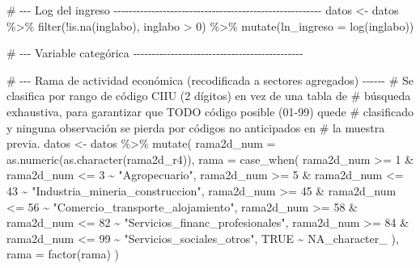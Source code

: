 \documentclass[
  spanish,
  letterpaper,
  DIV=11,
  numbers=noendperiod]{scrartcl}
\newenvironment{Shaded}{\begin{snugshade}}{\end{snugshade}}
\newcommand{\AlertTok}[1]{\textcolor[rgb]{0.68,0.00,0.00}{#1}}
\newcommand{\AttributeTok}[1]{\textcolor[rgb]{0.40,0.45,0.13}{#1}}
\newcommand{\CommentTok}[1]{\textcolor[rgb]{0.37,0.37,0.37}{#1}}
\newcommand{\ConstantTok}[1]{\textcolor[rgb]{0.56,0.35,0.01}{#1}}
\newcommand{\DecValTok}[1]{\textcolor[rgb]{0.68,0.00,0.00}{#1}}
\newcommand{\FunctionTok}[1]{\textcolor[rgb]{0.28,0.35,0.67}{#1}}
\newcommand{\NormalTok}[1]{\textcolor[rgb]{0.00,0.23,0.31}{#1}}
\newcommand{\OtherTok}[1]{\textcolor[rgb]{0.00,0.23,0.31}{#1}}
\newcommand{\SpecialCharTok}[1]{\textcolor[rgb]{0.37,0.37,0.37}{#1}}
\newcommand{\StringTok}[1]{\textcolor[rgb]{0.13,0.47,0.30}{#1}}
\begin{document}
\begin{Shaded}
\begin{Highlighting}[]
\CommentTok{\# {-}{-}{-} Log del ingreso {-}{-}{-}{-}{-}{-}{-}{-}{-}{-}{-}{-}{-}{-}{-}{-}{-}{-}{-}{-}{-}{-}{-}{-}{-}{-}{-}{-}{-}{-}{-}{-}{-}{-}{-}{-}{-}{-}{-}{-}{-}{-}{-}{-}{-}{-}{-}{-}{-}{-}{-}{-}{-}{-}{-}}
\NormalTok{datos }\OtherTok{\textless{}{-}}\NormalTok{ datos }\SpecialCharTok{\%\textgreater{}\%}
  \FunctionTok{filter}\NormalTok{(}\SpecialCharTok{!}\FunctionTok{is.na}\NormalTok{(inglabo), inglabo }\SpecialCharTok{\textgreater{}} \DecValTok{0}\NormalTok{) }\SpecialCharTok{\%\textgreater{}\%}
  \FunctionTok{mutate}\NormalTok{(}\AttributeTok{ln\_ingreso =} \FunctionTok{log}\NormalTok{(inglabo))}

\CommentTok{\# {-}{-}{-} Variable categórica {-}{-}{-}{-}{-}{-}{-}{-}{-}{-}{-}{-}{-}{-}{-}{-}{-}{-}{-}{-}{-}{-}{-}{-}{-}{-}{-}{-}{-}{-}{-}{-}{-}{-}{-}{-}{-}{-}{-}{-}{-}{-}{-}{-}{-}}

\CommentTok{\# {-}{-}{-} Rama de actividad económica (recodificada a sectores agregados) {-}{-}{-}{-}{-}{-}}
\CommentTok{\# Se clasifica por rango de código CIIU (2 dígitos) en vez de una tabla de}
\CommentTok{\# búsqueda exhaustiva, para garantizar que }\AlertTok{TODO}\CommentTok{ código posible (01{-}99) quede}
\CommentTok{\# clasificado y ninguna observación se pierda por códigos no anticipados en}
\CommentTok{\# la muestra previa.}
\NormalTok{datos }\OtherTok{\textless{}{-}}\NormalTok{ datos }\SpecialCharTok{\%\textgreater{}\%}
  \FunctionTok{mutate}\NormalTok{(}
    \AttributeTok{rama2d\_num =} \FunctionTok{as.numeric}\NormalTok{(}\FunctionTok{as.character}\NormalTok{(rama2d\_r4)),}
    \AttributeTok{rama =} \FunctionTok{case\_when}\NormalTok{(}
\NormalTok{      rama2d\_num }\SpecialCharTok{\textgreater{}=} \DecValTok{1}  \SpecialCharTok{\&}\NormalTok{ rama2d\_num }\SpecialCharTok{\textless{}=} \DecValTok{3}  \SpecialCharTok{\textasciitilde{}} \StringTok{"Agropecuario"}\NormalTok{,}
\NormalTok{      rama2d\_num }\SpecialCharTok{\textgreater{}=} \DecValTok{5}  \SpecialCharTok{\&}\NormalTok{ rama2d\_num }\SpecialCharTok{\textless{}=} \DecValTok{43} \SpecialCharTok{\textasciitilde{}} \StringTok{"Industria\_mineria\_construccion"}\NormalTok{,}
\NormalTok{      rama2d\_num }\SpecialCharTok{\textgreater{}=} \DecValTok{45} \SpecialCharTok{\&}\NormalTok{ rama2d\_num }\SpecialCharTok{\textless{}=} \DecValTok{56} \SpecialCharTok{\textasciitilde{}} \StringTok{"Comercio\_transporte\_alojamiento"}\NormalTok{,}
\NormalTok{      rama2d\_num }\SpecialCharTok{\textgreater{}=} \DecValTok{58} \SpecialCharTok{\&}\NormalTok{ rama2d\_num }\SpecialCharTok{\textless{}=} \DecValTok{82} \SpecialCharTok{\textasciitilde{}} \StringTok{"Servicios\_financ\_profesionales"}\NormalTok{,}
\NormalTok{      rama2d\_num }\SpecialCharTok{\textgreater{}=} \DecValTok{84} \SpecialCharTok{\&}\NormalTok{ rama2d\_num }\SpecialCharTok{\textless{}=} \DecValTok{99} \SpecialCharTok{\textasciitilde{}} \StringTok{"Servicios\_sociales\_otros"}\NormalTok{,}
      \ConstantTok{TRUE} \SpecialCharTok{\textasciitilde{}} \ConstantTok{NA\_character\_}
\NormalTok{    ),}
    \AttributeTok{rama =} \FunctionTok{factor}\NormalTok{(rama)}
\NormalTok{  )}


\end{Highlighting}
\end{Shaded}
\end{document}
